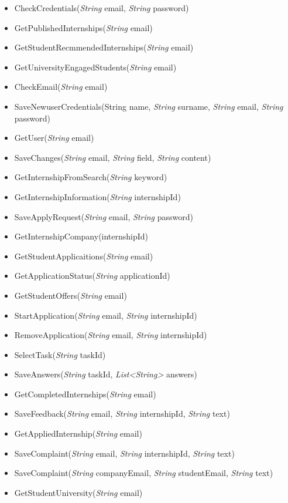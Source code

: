 \begin{itemize}
\begin{itemize}
\item CheckCredentials(\textit{String} email, \textit{String} password)
\item GetPublishedInternships(\textit{String} email)
\item GetStudentRecmmendedInternships(\textit{String} email)
\item GetUniversityEngagedStudents(\textit{String} email)
\item CheckEmail(\textit{String} email)
\item SaveNewuserCredentials(String name, \textit{String} surname, \textit{String} email, \textit{String} password)
\item GetUser(\textit{String} email)
\item SaveChanges(\textit{String} email, \textit{String} field, \textit{String} content)
\item GetInternshipFromSearch(\textit{String} keyword)
\item GetInternshipInformation(\textit{String} internshipId)
\item SaveApplyRequest(\textit{String} email, \textit{String} password)
\item GetInternshipCompany(internshipId)
\item GetStudentApplicaitions(\textit{String} email)
\item GetApplicationStatus(\textit{String} applicationId)
\item GetStudentOffers(\textit{String} email)
\item StartApplication(\textit{String} email, \textit{String} internshipId)
\item RemoveApplication(\textit{String} email, \textit{String}  internshipId)
\item SelectTask(\textit{String} taskId)
\item SaveAnswers(\textit{String} taskId, \textit{List<String>} answers)
\item GetCompletedInternships(\textit{String} email)
\item SaveFeedback(\textit{String} email, \textit{String} internshipId, \textit{String} text)
\item GetAppliedInternship(\textit{String} email)
\item SaveComplaint(\textit{String} email, \textit{String} internshipId, \textit{String} text)
\item SaveComplaint(\textit{String} companyEmail, \textit{String} studentEmail, \textit{String} text)
\item GetStudentUniversity(\textit{String} email)

\end{itemize}
\end{itemize}
